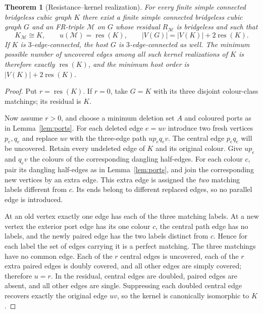 \documentclass[11pt]{article}
\newtheorem{theorem}{Theorem}
\newcommand{\rc}{\operatorname{res}}
\begin{document}
\begin{theorem}[Resistance--kernel realization]\label{thm:univ}
For every finite simple connected bridgeless cubic graph $K$ there exist a finite simple connected bridgeless cubic graph $G$ and an FR-triple $\mathcal M$ on $G$ whose residual $R_{\mathcal M}$ is \emph{bridgeless} and such that
\[
K_{\mathcal M}\cong K,\qquad u(\mathcal M)=\rc(K),\qquad
|V(G)|=|V(K)|+2\rc(K).
\]
If $K$ is $3$-edge-connected, the host $G$ is $3$-edge-connected as well. The minimum possible number of uncovered edges among all such kernel realizations of $K$ is therefore exactly $\rc(K)$, and the minimum host order is $|V(K)|+2\rc(K)$.
\end{theorem}
\begin{proof}
Put $r=\rc(K)$. If $r=0$, take $G=K$ with its three disjoint colour-class matchings; its residual is $K$.

Now assume $r>0$, and choose a minimum deletion set $A$ and coloured ports as in Lemma~\ref{lem:ports}. For each deleted edge $e=uv$ introduce two fresh vertices $p_e,q_e$ and replace $uv$ with the three-edge path $u p_e q_e v$. The central edge $p_eq_e$ will be uncovered. Retain every undeleted edge of $K$ and its original colour. Give $up_e$ and $q_ev$ the colours of the corresponding dangling half-edges. For each colour $c$, pair its dangling half-edges as in Lemma~\ref{lem:ports}, and join the corresponding new vertices by an extra edge. This extra edge is assigned the \emph{two} matching labels different from $c$. Its ends belong to different replaced edges, so no parallel edge is introduced.

At an old vertex exactly one edge has each of the three matching labels. At a new vertex the exterior port edge has its one colour $c$, the central path edge has no labels, and the newly paired edge has the two labels distinct from $c$. Hence for each label the set of edges carrying it is a perfect matching. The three matchings have no common edge. Each of the $r$ central edges is uncovered, each of the $r$ extra paired edges is doubly covered, and all other edges are simply covered; therefore $u=r$. In the residual, central edges are doubled, paired edges are absent, and all other edges are single. Suppressing each doubled central edge recovers exactly the original edge $uv$, so the kernel is canonically isomorphic to $K$.


\end{proof}
\end{document}
